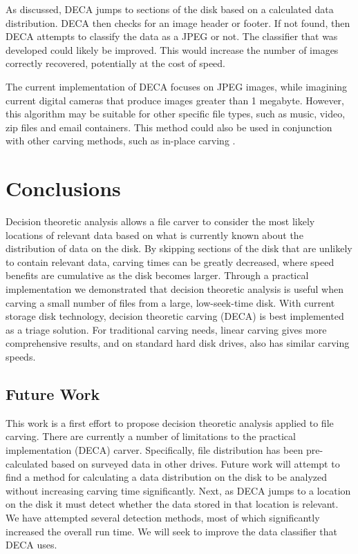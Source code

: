\documentclass[10pt,a4paper]{article}
\begin{document}
As discussed, DECA jumps to sections of the disk based on a calculated data distribution. DECA then checks for an image header or footer. If not found, then DECA attempts to classify the data as a JPEG or not. The classifier that was developed could likely be improved. This would increase the number of images correctly recovered, potentially at the cost of speed.

The current implementation of DECA focuses on JPEG images, while imagining current digital cameras that produce images greater than 1 megabyte. However, this algorithm may be suitable for other specific file types, such as music, video, zip files and email containers. This method could also be used in conjunction with other carving methods, such as in-place carving \cite{Richard2007inplace, MeijerRob2012}.

\section{Conclusions}
Decision theoretic analysis allows a file carver to consider the most likely locations of relevant data based on what is currently known about the distribution of data on the disk. By skipping sections of the disk that are unlikely to contain relevant data, carving times can be greatly decreased, where speed benefits are cumulative as the disk becomes larger. Through a practical implementation we demonstrated that decision theoretic analysis is useful when carving a small number of files from a large, low-seek-time disk. With current storage disk technology, decision theoretic carving (DECA) is best implemented as a triage solution. For traditional carving needs, linear carving gives more comprehensive results, and on standard hard disk drives, also has similar carving speeds.

\subsection{Future Work}
This work is a first effort to propose decision theoretic analysis applied to file carving. There are currently a number of limitations to the practical implementation (DECA) carver. Specifically, file distribution has been pre-calculated based on surveyed data in other drives. Future work will attempt to find a method for calculating a data distribution on the disk to be analyzed without increasing carving time significantly. Next, as DECA jumps to a location on the disk it must detect whether the data stored in that location is relevant. We have attempted several detection methods, most of which significantly increased the overall run time. We will seek to improve the data classifier that DECA uses. 



	
\end{document}
